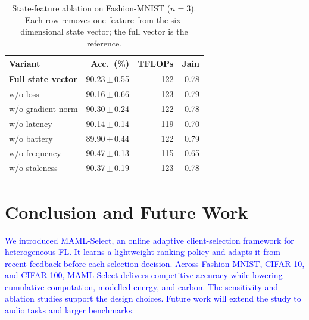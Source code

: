 \documentclass[journal]{IEEEtran}
\newcommand{\revision}[1]{\textcolor{blue}{#1}}
\begin{document}
\begin{table}[H]
\vspace{1mm}
\centering
\caption{State-feature ablation on Fashion-MNIST ($n=3$). Each row removes one feature from the
six-dimensional state vector; the full vector is the reference.}
\label{tab:ablation}
\scriptsize
\setlength{\tabcolsep}{3.4pt}
\renewcommand{\arraystretch}{0.92}
\begin{tabular*}{\columnwidth}{@{\extracolsep{\fill}}lrrr@{}}
\toprule
Variant & Acc.\ (\%) & TFLOPs & Jain \\
\midrule
\textbf{Full state vector} & 90.23\,$\pm$\,0.55 & 122 & 0.78 \\
w/o loss & 90.16\,$\pm$\,0.66 & 123 & 0.79 \\
w/o gradient norm & 90.30\,$\pm$\,0.24 & 122 & 0.78 \\
w/o latency & 90.14\,$\pm$\,0.14 & 119 & 0.70 \\
w/o battery & 89.90\,$\pm$\,0.44 & 122 & 0.79 \\
w/o frequency & 90.47\,$\pm$\,0.13 & 115 & 0.65 \\
w/o staleness & 90.37\,$\pm$\,0.19 & 123 & 0.78 \\
\bottomrule
\end{tabular*}
\vspace{0mm}
\end{table}


\FloatBarrier
\section{Conclusion and Future Work}
\revision{We introduced MAML-Select, an online adaptive client-selection framework for heterogeneous FL. It learns a lightweight ranking policy and adapts it from recent feedback before each selection decision. Across Fashion-MNIST, CIFAR-10, and CIFAR-100, MAML-Select delivers competitive accuracy while lowering cumulative computation, modelled energy, and carbon. The sensitivity and ablation studies support the design choices. Future work will extend the study to audio tasks and larger benchmarks.}

\vspace{-1mm}
{\scriptsize


}
\end{document}
